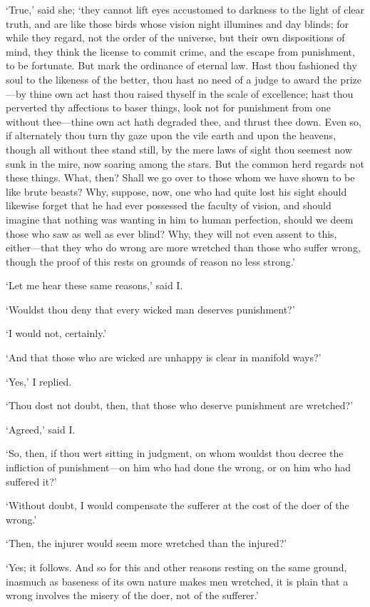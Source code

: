 \documentclass[12pt]{book}
\begin{document}
`True,' said she; `they cannot lift eyes accustomed to darkness to the
light of clear truth, and are like those birds whose vision night
illumines and day blinds; for while they regard, not the order of the
universe, but their own dispositions of mind, they think the license to
commit crime, and the escape from punishment, to be fortunate. But mark
the ordinance of eternal law. Hast thou fashioned thy soul to the
likeness of the better, thou hast no need of a judge to award the
prize---by thine own act hast thou raised thyself in the scale of
excellence; hast thou perverted thy affections to baser things, look not
for punishment from one without thee---thine own act hath degraded thee,
and thrust thee down. Even so, if alternately thou turn thy gaze upon
the vile earth and upon the heavens, though all without thee stand
still, by the mere laws of sight thou seemest now sunk in the mire, now
soaring among the stars. But the common herd regards not these things.
What, then? Shall we go over to those whom we have shown to be like
brute beasts? Why, suppose, now, one who had quite lost his sight
should likewise forget that he had ever possessed the faculty of vision,
and should imagine that nothing was wanting in him to human perfection,
should we deem those who saw as well as ever blind? Why, they will not
even assent to this, either---that they who do wrong are more wretched
than those who suffer wrong, though the proof of this rests on grounds
of reason no less strong.'

`Let me hear these same reasons,' said I.

`Wouldst thou deny that every wicked man deserves punishment?'

`I would not, certainly.'

`And that those who are wicked are unhappy is clear in manifold ways?'

`Yes,' I replied.

`Thou dost not doubt, then, that those who deserve punishment are
wretched?'

`Agreed,' said I.

`So, then, if thou wert sitting in judgment, on whom wouldst thou decree
the infliction of punishment---on him who had done the wrong, or on him
who had suffered it?'

`Without doubt, I would compensate the sufferer at the cost of the doer
of the wrong.'

`Then, the injurer would seem more wretched than the injured?'

`Yes; it follows. And so for this and other reasons resting on the same
ground, inasmuch as baseness of its own nature makes men wretched, it is
plain that a wrong involves the misery of the doer, not of the
sufferer.'
\end{document}
